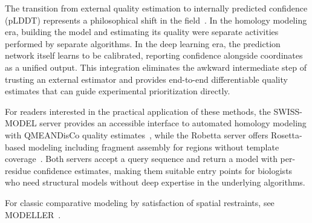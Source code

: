 The transition from external quality estimation to internally predicted confidence (pLDDT) represents a philosophical shift in the field~\cite{jumper2021}. In the homology modeling era, building the model and estimating its quality were separate activities performed by separate algorithms. In the deep learning era, the prediction network itself learns to be calibrated, reporting confidence alongside coordinates as a unified output. This integration eliminates the awkward intermediate step of trusting an external estimator and provides end-to-end differentiable quality estimates that can guide experimental prioritization directly.

For readers interested in the practical application of these methods, the SWISS-MODEL server provides an accessible interface to automated homology modeling with QMEANDisCo quality estimates~\cite{waterhouse2018}, while the Robetta server offers Rosetta-based modeling including fragment assembly for regions without template coverage~\cite{simons1997}. Both servers accept a query sequence and return a model with per-residue confidence estimates, making them suitable entry points for biologists who need structural models without deep expertise in the underlying algorithms.

For classic comparative modeling by satisfaction of spatial restraints, see MODELLER~\cite{sali1993}.
